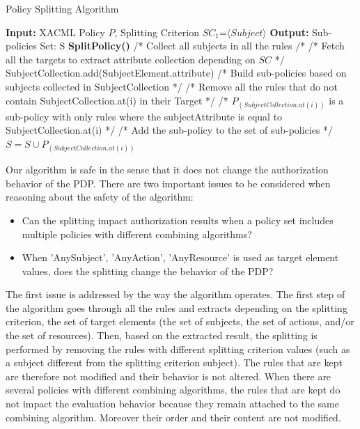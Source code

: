 \begin{algorithmic}
\begin{algorithm}[t]
\caption{Policy Splitting Algorithm}
\STATE \textbf{Input:} XACML Policy $P$, Splitting Criterion $SC_{1}$=$\langle Subject \rangle$
\STATE \textbf{Output:} Sub-policies Set: S
\STATE \textbf{SplitPolicy()}
\STATE /* Collect all subjects in all the rules /*
\STATE /* Fetch all the targets to extract attribute collection depending on $SC$ */
\STATE SubjectCollection.add(SubjectElement.attribute)
\ENDFOR
\ENDFOR
\STATE /* Build sub-policies based on subjects collected in SubjectCollection */
\STATE /* Remove all the rules that do not contain SubjectCollection.at(i) in their Target */
\ENDIF 
\ENDIF
\ENDFOR
\STATE /* $P_{(SubjectCollection.at(i))}$ is a sub-policy with only rules where the subjectAttribute is equal to SubjectCollection.at(i) */
\STATE /* Add the sub-policy to the set of sub-policies */
\STATE $S=S \cup P_{(SubjectCollection.at(i))}$
\ENDFOR
\end{algorithm}
\end{algorithmic}

Our algorithm is safe in the sense that it does not change the authorization behavior of the PDP. 
There are two important issues to be considered when reasoning about the safety of the algorithm:
\begin{itemize}
 \item Can the splitting impact authorization results when a policy set includes multiple policies with different combining algorithms?
 \item When 'AnySubject', 'AnyAction', 'AnyResource' is used as target element values, does the splitting change the behavior of the PDP?
\end{itemize}
The first issue is addressed by the way the algorithm operates. The first step of the algorithm goes through all the rules and extracts 
depending on the splitting criterion, the set of target elements (the set of subjects, 
the set of actions, and/or the set of resources). Then, based on the extracted result, the splitting is performed by removing 
the rules with different splitting criterion values (such as a subject different from 
the splitting criterion subject). The rules that are kept are therefore not modified and their behavior is not altered. When there 
are several policies with different combining algorithms, the rules that are kept do not impact the evaluation behavior 
because they remain attached to the same combining algorithm. Moreover their order and their content are not modified.



